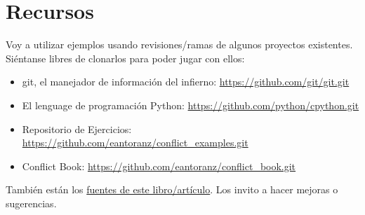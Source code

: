
\section{Recursos}

Voy a utilizar ejemplos usando revisiones/ramas de algunos proyectos existentes. Siéntanse libres de clonarlos
para poder jugar con ellos:

\begin{itemize}

	\item git, el manejador de información del infierno: \url{https://github.com/git/git.git}
	\label{git_repo}

	\item El lenguage de programación Python: \url{https://github.com/python/cpython.git}
	\label{python_repo}
	
	\item Repositorio de Ejercicios: \url{https://github.com/eantoranz/conflict_examples.git}
	\label{exercises_repo}

	\item Conflict Book: \url{https://github.com/eantoranz/conflict_book.git}
	\label{exercises_repo}
	
\end{itemize}

También están los \href{https://github.com/eantoranz/conflict_book.git}{fuentes de este libro/artículo}.
Los invito a hacer mejoras o sugerencias.
